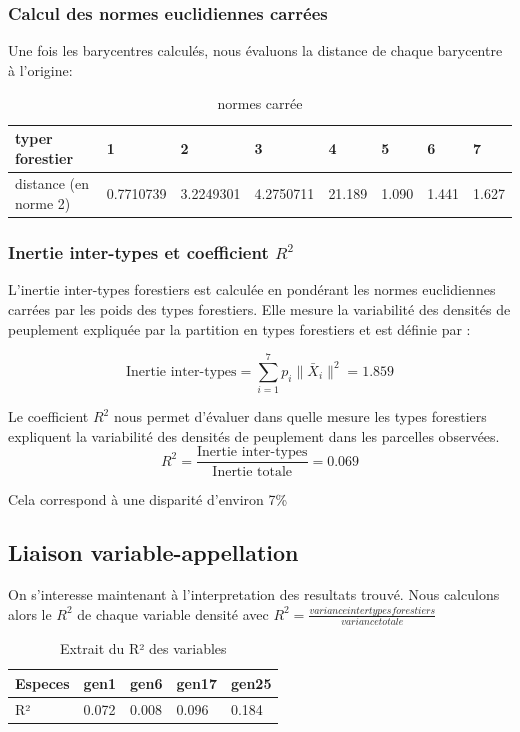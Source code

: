 \documentclass{article}
\begin{document}
\subsubsection{Calcul des normes euclidiennes carrées}
Une fois les barycentres calculés, nous évaluons la distance de chaque barycentre à l'origine:

\begin{table}[H]
    \begin{tabular}{|l|l|l|l|l|l|l|l|}
    \hline
    typer forestier       & 1         & 2         & 3         & 4      & 5     & 6     & 7     \\ \hline
    distance (en norme 2) & 0.7710739 & 3.2249301 & 4.2750711 & 21.189 & 1.090 & 1.441 & 1.627 \\ \hline
    \end{tabular}
    \caption{normes carrée}
    \end{table}





\subsubsection{Inertie inter-types et coefficient $R^2$}


L'inertie inter-types forestiers est calculée en pondérant les normes euclidiennes carrées par les poids des types forestiers. Elle mesure la variabilité des densités de peuplement expliquée par la partition en types forestiers et est définie par :

\[
\text{Inertie inter-types} = \sum_{i=1}^{7} p_i \|\bar{X}_i\|^2 = 1.859
\]

Le coefficient $R^2$ nous permet d'évaluer dans quelle mesure les types forestiers expliquent la variabilité des densités de peuplement dans les parcelles observées.
\[
R^2 = \frac{\text{Inertie inter-types}}{\text{Inertie totale}}=0.069
\]

Cela correspond à une disparité d'environ 7\%

\subsection{Liaison variable-appellation}

On s'interesse maintenant à l'interpretation des resultats trouvé. Nous calculons alors le $R^2$ de chaque variable densité avec $R^2 = \frac{variance inter types forestiers}{variance totale}$

\begin{table}[H]
    \centering
    \begin{tabular}{|l|l|l|l|l|}
    \hline
    Especes & gen1  & gen6  & gen17 & gen25 \\ \hline
    R²      & 0.072 & 0.008 & 0.096 & 0.184 \\ \hline
    \end{tabular}
    \centering
    \caption{Extrait du R² des variables}
    \end{table}
\end{document}
